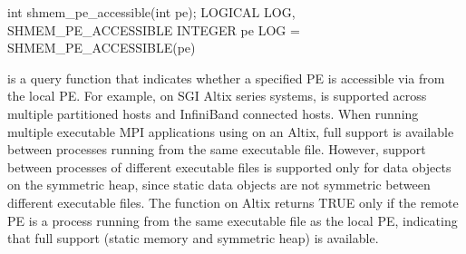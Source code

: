 \synC     
int shmem_pe_accessible(int pe);
\synF
LOGICAL LOG, SHMEM_PE_ACCESSIBLE
INTEGER pe
LOG = SHMEM_PE_ACCESSIBLE(pe)

{
        is  a  query function  that indicates  whether  a
       specified PE is accessible via \openshmem from the local PE. For example, on  SGI	Altix  series  systems, \openshmem is  supported  across multiple
       partitioned hosts and InfiniBand connected hosts. When running multiple executable MPI applications using \openshmem on an Altix,
       full \openshmem support is available between processes running from the same
       executable file. However, \openshmem support between processes of different
       executable  files  is  supported only for data objects on the symmetric
       heap, since static data objects are  not symmetric  between  different
       executable  files. The  function on Altix returns
       TRUE only if  the  remote  \ac{PE}  is  a  process  running  from  the  same
       executable  file	 as  the  local \ac{PE}, indicating that full \openshmem support
       (static memory and symmetric heap) is available.
}
{

\notesB{}
}

\eAPI